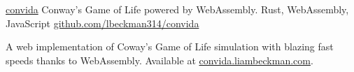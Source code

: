 \showoff
{\href{https://convida.liambeckman.com/}{convida}}
{Conway's Game of Life powered by WebAssembly.}
{Rust, WebAssembly, JavaScript}
{\href{https://github.com/lbeckman314/convida}{github.com/lbeckman314/convida}}

A web implementation of Coway's Game of Life simulation with blazing fast speeds thanks to WebAssembly. Available at \textcolor{my-blue}{\href{https://convida.liambeckman.com}{convida.liambeckman.com}}.

\myBreak

